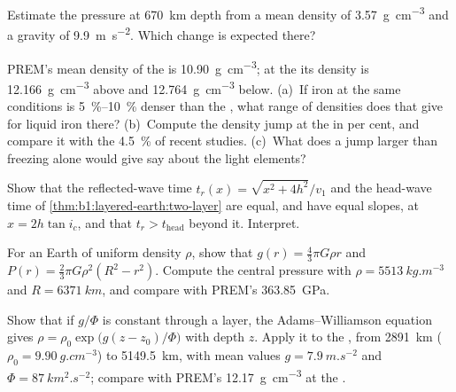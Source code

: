 \begin{exercise}[$\star\star$]\label{exo:b1:layered-earth:8}
Estimate the pressure at \qty{670}{km} depth from a mean density of
\qty{3.57}{g.cm^{-3}} and a gravity of \qty{9.9}{m.s^{-2}}. Which 
change is expected there?
\end{exercise}

\begin{exercise}[$\star\star$]\label{exo:b1:layered-earth:9}
PREM's mean density of the  is \qty{10.90}{g.cm^{-3}}; at the
 its density is \qty{12.166}{g.cm^{-3}} above and
\qty{12.764}{g.cm^{-3}} below. (a)~If iron at the same conditions is
\qtyrange{5}{10}{\percent} denser than the , what range of densities
does that give for liquid iron there? (b)~Compute the density jump at the
 in per cent, and compare it with the \qty{4.5}{\percent}
of recent studies. (c)~What does a jump larger than freezing alone would give
say about the light elements?
\end{exercise}

\begin{exercise}[$\star\star\star$]\label{exo:b1:layered-earth:10}
Show that the reflected-wave time $t_r(x) = \sqrt{x^2 + 4h^2}/v_1$ and the
head-wave time of \cref{thm:b1:layered-earth:two-layer} are equal, and have
equal slopes, at $x = 2h\tan i_c$, and that $t_r > t_{\text{head}}$ beyond it.
Interpret.
\end{exercise}

\begin{exercise}[$\star\star\star$]\label{exo:b1:layered-earth:11}
For an Earth of uniform density $\rho$, show that $g(r) = \tfrac43\pi G\rho r$
and $P(r) = \tfrac23\pi G\rho^2(R^2 - r^2)$. Compute the central pressure with
$\rho = \qty{5513}{kg.m^{-3}}$ and $R = \qty{6371}{km}$, and compare with PREM's
\qty{363.85}{GPa}.
\end{exercise}

\begin{exercise}[$\star\star\star$]\label{exo:b1:layered-earth:12}
Show that if $g/\Phi$ is constant through a layer, the Adams--Williamson
equation gives $\rho = \rho_0\exp\bigl(g(z - z_0)/\Phi\bigr)$ with depth $z$.
Apply it to the , from \qty{2891}{km} ($\rho_0 =
\qty{9.90}{g.cm^{-3}}$) to \qty{5149.5}{km}, with mean values
$g = \qty{7.9}{m.s^{-2}}$ and $\Phi = \qty{87}{km^2.s^{-2}}$; compare with
PREM's \qty{12.17}{g.cm^{-3}} at the .
\end{exercise}

